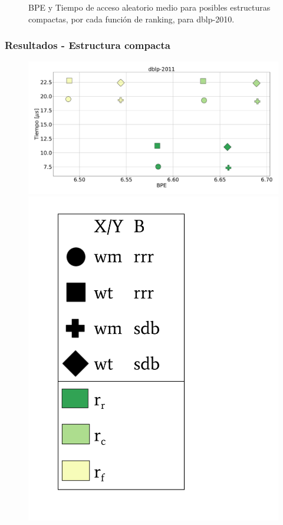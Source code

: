 \begin{frame}
\begin{figure}
	\caption{BPE y Tiempo de acceso aleatorio medio para posibles estructuras compactas, por cada función de ranking, para dblp-2010.}
\end{figure}

\end{frame}

\begin{frame}
\frametitle{Resultados - Estructura compacta}

\begin{figure}
	\centering
	
    	\begin{minipage}{1\textwidth}
    		\centering
    		\begin{minipage}{0.8\textwidth}
    			\centering
    			\includegraphics[width=1\linewidth]{../img/sdsl/aleatorioBig/dblp-2011.pdf}
    		\end{minipage}
    		\begin{minipage}{0.15\textwidth}
    			\centering
    			\includegraphics[scale=.15, clip, trim=70 0 0 0]{../img/sdsl/label.pdf}

\end{minipage}
\end{minipage}
\end{figure}
\end{frame}
